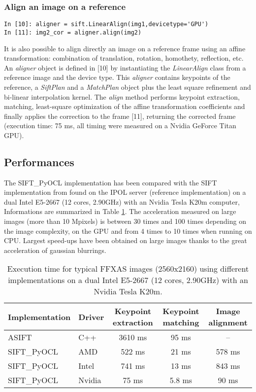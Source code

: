 \documentclass[preprint]{iucr}
\begin{document}
\subsubsection{Align an image on a reference}
\begin{verbatim}
In [10]: aligner = sift.LinearAlign(img1,devicetype='GPU')
In [11]: img2_cor = aligner.align(img2)
\end{verbatim}
It is also possible to align directly an image on a reference frame using an
affine transformation: combination of translation, rotation, homothety,
reflection, etc.
An \emph{aligner} object is defined in [10] by instantiating the 
\emph{LinearAlign} class from a reference image and the device type. 
This \emph{aligner} contains keypoints of the
reference, a \emph{SiftPlan} and a \emph{MatchPlan} object plus the least square
refinement and bi-linear interpolation kernel.
The \emph{align} method performs keypoint extraction, matching, least-square
optimization of the affine transformation coefficients and finally applies the
correction to the frame [11], returning the corrected frame (execution time:
75 ms, all timing were measured on a Nvidia GeForce Titan GPU). 

\subsection{Performances}

The SIFT\_PyOCL implementation has been compared with the SIFT
implementation from \cite{ASIFT} found on the IPOL server (reference
implementation) on a dual Intel E5-2667 (12 cores, 2.90GHz) with an Nvidia Tesla
K20m computer, Informations are summarized in Table \ref{bench}. 
The acceleration measured on large images (more than 10 Mpixels) is between 30
times and 100 times depending on the image complexity, on the GPU and from 4
times to 10 times when running on CPU. 
Largest speed-ups have been obtained on large images thanks to the
great acceleration of gaussian blurrings. 

\begin{table}
\caption{Execution time for typical FFXAS images (2560x2160) using different
implementations on a dual Intel E5-2667 (12 cores, 2.90GHz) with an Nvidia Tesla
K20m.}
\label{bench}
\vspace{1mm}
\begin{center}
\begin{tabular}{l l ccc}
Implementation & Driver & Keypoint extraction & Keypoint matching &
Image alignment\\
\hline
ASIFT        &   C++     &   3610 ms  & 95 ms  & --  \\ 
SIFT\_PyOCL  &   AMD  &   522 ms  &  21 ms&  578 ms \\
SIFT\_PyOCL  &   Intel  &   741 ms  &  13 ms&  843 ms\\
SIFT\_PyOCL  &   Nvidia  &    75 ms  &  5.8 ms & 90 ms\\
\end{tabular}
\end{center}
\end{table}
\end{document}
